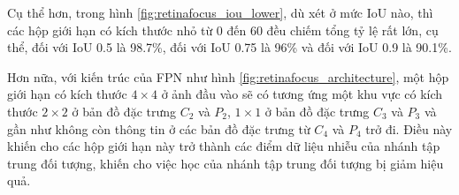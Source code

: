 {    \noindent
    Cụ thể hơn, trong hình \ref{fig:retinafocus_iou_lower}, dù xét ở mức IoU nào, thì các hộp giới hạn có kích thước nhỏ từ 0 đến 60 đều chiếm tổng tỷ lệ rất lớn, cụ thể, đối với IoU 0.5 là 98.7\%, đối với IoU 0.75 là 96\% và đối với IoU 0.9 là 90.1\%.

    \noindent
    Hơn nữa, với kiến trúc của FPN như hình \ref{fig:retinafocus_architecture}, một hộp giới hạn có kích thước $4 \times 4$ ở ảnh đầu vào sẽ có tương ứng một khu vực có kích thước $2 \times 2$ ở bản đồ đặc trưng ${C}_{2}$ và ${P}_{2}$, $1 \times 1$ ở bản đồ đặc trưng ${C}_{3}$ và ${P}_{3}$ và gần như không còn thông tin ở các bản đồ đặc trưng từ ${C}_{4}$ và ${P}_{4}$ trở đi.
    Điều này khiến cho các hộp giới hạn này trở thành các điểm dữ liệu nhiễu của nhánh tập trung đối tượng, khiến cho việc học của nhánh tập trung đối tượng bị giảm hiệu quả.

}

